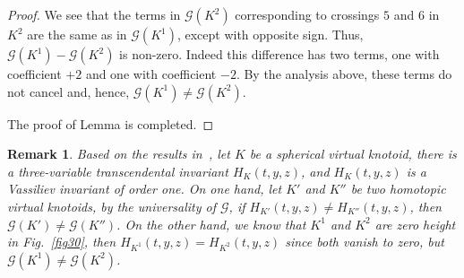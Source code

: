 \documentclass[11pt]{amsart}
\theoremstyle{noparens}
\newtheorem{remark}{Remark}[section]
\numberwithin{equation}{section}
\numberwithin{equation}{section}
\begin{document}
\begin{proof}
We see that the terms in $\mathcal{G}(K^2)$ corresponding to crossings $5$ and $6$ in $K^2$ are the same as in $\mathcal{G}(K^1)$, except with opposite sign. Thus, $\mathcal{G}(K^1) - \mathcal{G}(K^2)$ is non-zero. Indeed this difference has two terms, one with coefficient $+2$ and one with coefficient $-2$. By the analysis above, these terms do not cancel and, hence, $\mathcal{G}(K^1) \neq \mathcal{G}(K^2)$.

The proof of Lemma is completed. 
\end{proof}

\begin{remark} {\rm 
Based on the results in~\cite{FLV}, let $K$ be a spherical virtual knotoid, there is a three-variable transcendental invariant $H_{K}(t,y,z)$, and $H_{K}(t,y,z)$ is a Vassiliev invariant of order one. On one hand, let $K'$ and $K''$ be two homotopic virtual knotoids, by the universality of $\mathcal{G}$, if $H_{K'}(t,y,z) \neq H_{K''}(t,y,z)$, then $\mathcal{G}(K')\neq \mathcal{G}(K'')$. On the other hand, we know that $K^1$ and $K^2$ are zero height in Fig.~\ref{fig30}, then $H_{K^1}(t,y,z) = H_{K^2}(t,y,z)$ since both vanish to zero, but $\mathcal{G}(K^1) \neq \mathcal{G}(K^2)$. 
}
\end{remark}
\end{document}
